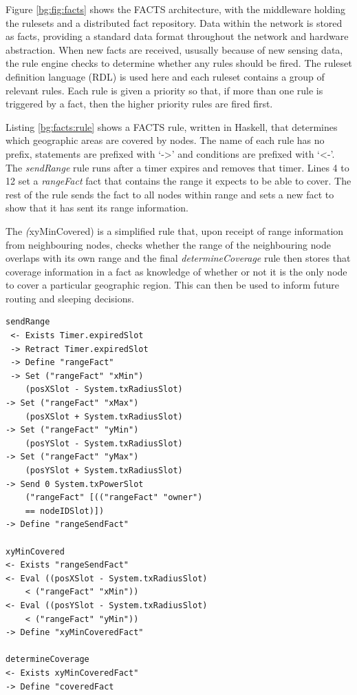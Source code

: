 		Figure \ref{bg:fig:facts} shows the FACTS architecture, with the middleware holding the rulesets and a distributed fact repository. Data within the network is stored as facts, providing a standard data format throughout the network and hardware abstraction. When new facts are received, ususally because of new sensing data, the rule engine checks to determine whether any rules should be fired. The ruleset definition language (RDL) is used here and each ruleset contains a group of relevant rules. Each rule is given a priority so that, if more than one rule is triggered by a fact, then the higher priority rules are fired first.

		Listing \ref{bg:facts:rule} shows a FACTS rule, written in Haskell, that determines which geographic areas are covered by nodes. The name of each rule has no prefix, statements are prefixed with `->' and conditions are prefixed with `<-'. The \textit{sendRange} rule runs after a timer expires and removes that timer. Lines 4 to 12 set a \textit{rangeFact} fact that contains the range it expects to be able to cover. The rest of the rule sends the fact to all nodes within range and sets a new fact to show that it has sent its range information. 

		The \textit(xyMinCovered) is a simplified rule that, upon receipt of range information from neighbouring nodes, checks whether the range of the neighbouring node overlaps with its own range and the final \textit{determineCoverage} rule then stores that coverage information in a fact as knowledge of whether or not it is the only node to cover a particular geographic region. This can then be used to inform future routing and sleeping decisions.

		\begin{lstlisting}[caption={Coverage Algorithm in FACTS Rules}, label={bg:facts:rule}]
 sendRange
 <- Exists Timer.expiredSlot
 -> Retract Timer.expiredSlot 
 -> Define "rangeFact"
 -> Set ("rangeFact" "xMin")
	(posXSlot - System.txRadiusSlot)
-> Set ("rangeFact" "xMax") 
	(posXSlot + System.txRadiusSlot)
-> Set ("rangeFact" "yMin")
	(posYSlot - System.txRadiusSlot)
-> Set ("rangeFact" "yMax")
	(posYSlot + System.txRadiusSlot)
-> Send 0 System.txPowerSlot 
	("rangeFact" [(("rangeFact" "owner")
	== nodeIDSlot)])
-> Define "rangeSendFact"

xyMinCovered
<- Exists "rangeSendFact"
<- Eval ((posXSlot - System.txRadiusSlot)
	< ("rangeFact" "xMin"))
<- Eval ((posYSlot - System.txRadiusSlot)
	< ("rangeFact" "yMin"))
-> Define "xyMinCoveredFact" 

determineCoverage
<- Exists xyMinCoveredFact"
-> Define "coveredFact
		\end{lstlisting}

